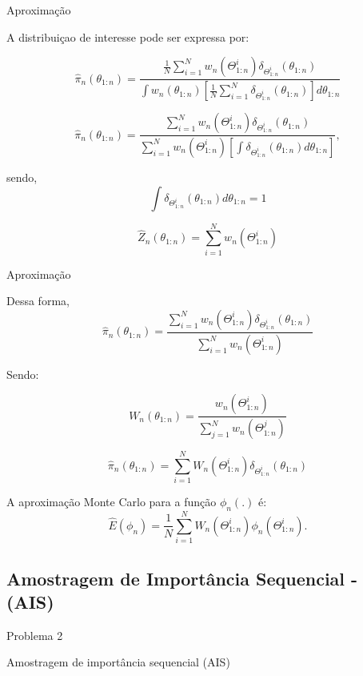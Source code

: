 \documentclass{beamer}
\begin{document}
\begin{frame}{Aproximação}

A distribuiçao de interesse pode ser expressa por:

$$\hat{\pi}_n(\theta_{1:n})= \frac{\frac{1}{N} \sum^N_{i=1} w_n(\Theta^i_{1:n})\delta_{\Theta^i_{1:n}}(\theta_{1:n})}{ \int  w_n(\theta_{1:n})\left[ \frac{1}{N} \sum^N_{i=1} \delta_{\Theta^i_{1:n}}(\theta_{1:n}) \right] d\theta_{1:n}} $$

\pause


$$\hat{\pi}_n(\theta_{1:n})= \frac{ \sum^N_{i=1} w_n(\Theta^i_{1:n})\delta_{\Theta^i_{1:n}}(\theta_{1:n})}{   \sum^N_{i=1} w_n(\Theta^i_{1:n})\left[ \int \delta_{\Theta^i_{1:n}}(\theta_{1:n}) d\theta_{1:n} \right] }, $$

\pause
sendo,
$$ \int \delta_{\Theta^i_{1:n}}(\theta_{1:n}) d\theta_{1:n} =1 $$

$$\hat{Z}_n(\theta_{1:n})=    \sum^N_{i=1} w_n(\Theta^i_{1:n}) $$


\end{frame}



\begin{frame}{Aproximação}

Dessa forma,
$$\hat{\pi}_n(\theta_{1:n})= \frac{\sum^N_{i=1} w_n(\Theta^i_{1:n})\delta_{\Theta^i_{1:n}}(\theta_{1:n})}{\sum^N_{i=1} w_n(\Theta^i_{1:n})} $$

\pause

Sendo:

$$W_n(\theta_{1:n})= \frac{ w_n(\Theta^i_{1:n})}{ \sum^N_{j=1} w_n(\Theta^j_{1:n})} $$

\pause

$$\hat{\pi}_n(\theta_{1:n})= \sum^N_{i=1} W_n(\Theta^i_{1:n})\delta_{\Theta^i_{1:n}}(\theta_{1:n}) $$

\pause
A aproximação Monte Carlo para a função $\phi_n(.)$ é:
$$
\hat{E}(\phi_n) = \frac{1}{N} \sum_{i=1}^N W_n(\Theta^i_{1:n}) \phi_n(\Theta^i_{1:n}).
$$

\end{frame}


\subsection{Amostragem de Importância Sequencial - (AIS)}

\begin{frame}{Problema 2}
    \begin{block}{}
      \Huge  Amostragem de importância sequencial (AIS)
    \end{block}
\end{frame}
\end{document}
